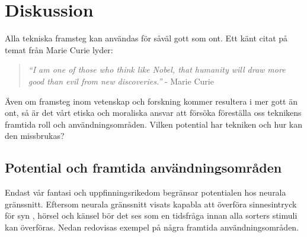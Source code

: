 \documentclass[12pt, a4paper]{article}
\begin{document}

%
%



\section{Diskussion}

Alla tekniska framsteg kan användas för såväl gott som ont. Ett känt citat på temat från Marie Curie lyder:

\begin{quote}
	\textit{``I am one of those who think like Nobel, that humanity will draw more good than evil from new discoveries.''} - Marie Curie \cite{curie_quote}
\end{quote}

Även om framsteg inom vetenskap och forskning kommer resultera i mer gott än ont, så är det vårt etiska och moraliska ansvar att försöka föreställa oss teknikens framtida roll och användningsområden. Vilken potential har tekniken och hur kan den missbrukas?


\subsection{Potential och framtida användningsområden}

Endast vår fantasi och uppfinningsrikedom begränsar potentialen hos neurala gränssnitt. Eftersom neurala gränssnitt visats kapabla att överföra sinnesintryck för syn \cite{sight1,sight2}, hörsel \cite{sound} och känsel \cite{touch} bör det ses som en tidsfråga innan alla sorters stimuli kan överföras. Nedan redovisas exempel på några framtida användningsområden.
\end{document}
